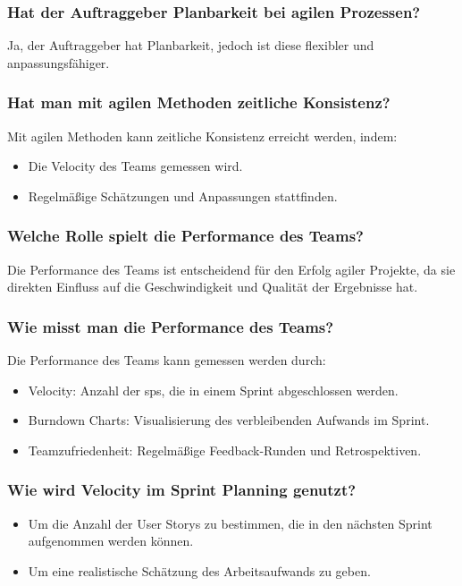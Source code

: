 \documentclass[main.tex]{subfiles}
\begin{document}
\subsubsection*{Hat der Auftraggeber Planbarkeit bei agilen Prozessen?}
Ja, der Auftraggeber hat Planbarkeit, jedoch ist diese flexibler und anpassungsfähiger.

\subsubsection*{Hat man mit agilen Methoden zeitliche Konsistenz?}
Mit agilen Methoden kann zeitliche Konsistenz erreicht werden, indem:
\begin{itemize}
    \item Die \gls{Velocity} des Teams gemessen wird.
    \item Regelmäßige Schätzungen und Anpassungen stattfinden.
\end{itemize}

\subsubsection*{Welche Rolle spielt die Performance des Teams?}
Die Performance des Teams ist entscheidend für den Erfolg agiler Projekte, da sie direkten Einfluss auf die Geschwindigkeit und Qualität der Ergebnisse hat.

\subsubsection*{Wie misst man die Performance des Teams?}
Die Performance des Teams kann gemessen werden durch:
\begin{itemize}
    \item \gls{Velocity}: Anzahl der \glspl{sp}, die in einem \gls{Sprint} abgeschlossen werden.
    \item Burndown Charts: Visualisierung des verbleibenden Aufwands im \gls{Sprint}.
    \item Teamzufriedenheit: Regelmäßige Feedback-Runden und Retrospektiven.
\end{itemize}

\subsubsection*{Wie wird \gls{Velocity} im \gls{Sprint Planning} genutzt?}
\begin{itemize}
    \item Um die Anzahl der \glspl{User Story} zu bestimmen, die in den nächsten \gls{Sprint} aufgenommen werden können.
    \item Um eine realistische Schätzung des Arbeitsaufwands zu geben.
\end{itemize}
\end{document}
